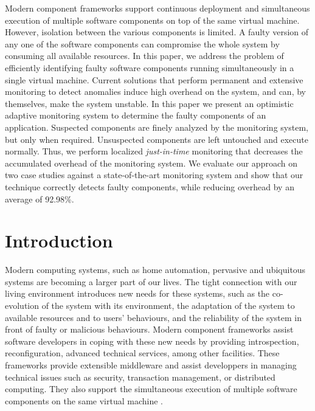 Modern component frameworks support continuous deployment and simultaneous execution of multiple software components on
top of the same virtual machine.
However, isolation between the various components is limited.
A faulty version of any one of the software components can compromise the whole system by consuming all available resources.
In this paper, we address the problem of efficiently identifying faulty software components running simultaneously in a single virtual machine.
Current solutions that perform permanent and extensive monitoring to detect anomalies induce high overhead on the system,
and can, by themselves, make the system unstable.
In this paper we present an optimistic adaptive monitoring system to determine the faulty components of an application.
Suspected components are finely analyzed by the monitoring system, but only when required.
Unsuspected components are left untouched and execute normally.
Thus, we perform localized \textit{just-in-time} monitoring that decreases the accumulated overhead of the monitoring system.
We evaluate our approach on two case studies against a state-of-the-art monitoring system and show that our technique correctly
detects faulty components, while reducing overhead by an average of 92.98\%.


\section{Introduction}\label{sec:intro}

Modern computing systems, such as home automation, pervasive and ubiquitous systems are becoming a larger part of our lives.
The tight connection with our living environment introduces new needs for these systems, such as the co-evolution of the system with its environment, the adaptation of the system to available resources and to users' behaviours, and the reliability of the system in front of faulty or malicious behaviours.
Modern component frameworks assist software developers in coping with these new needs by providing introspection, reconfiguration, advanced technical services, among other facilities.
These frameworks provide extensible middleware and assist developpers in managing technical issues such as security, transaction management, or distributed computing.
They also support the simultaneous execution of multiple software components on the same virtual machine \cite{OSGI:r5,Kevoree,bruneton06}.

